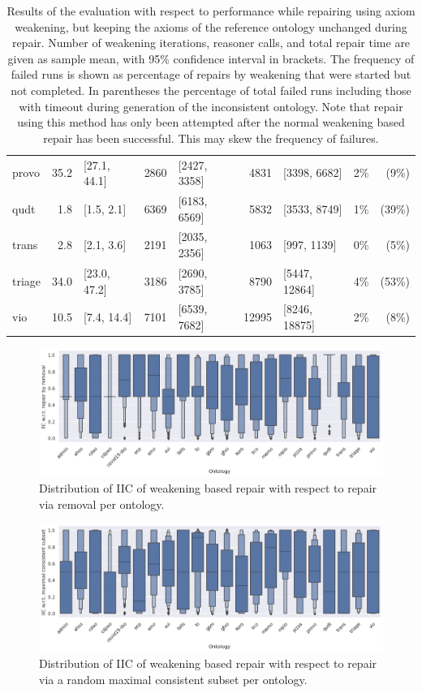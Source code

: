 \begin{table}[htbp]
\begin{tabular}{|l|r@{ }lr@{ }lr@{ }lr@{ }r|}
    provo & 35.2 & [27.1, 44.1] & 2860 & [2427, 3358] & 4831 & [3398, 6682] & 2\% & (9\%) \\
    qudt & 1.8 & [1.5, 2.1] & 6369 & [6183, 6569] & 5832 & [3533, 8749] & 1\% & (39\%) \\
    trans & 2.8 & [2.1, 3.6] & 2191 & [2035, 2356] & 1063 & [997, 1139] & 0\% & (5\%) \\
    triage & 34.0 & [23.0, 47.2] & 3186 & [2690, 3785] & 8790 & [5447, 12864] & 4\% & (53\%) \\
    vio & 10.5 & [7.4, 14.4] & 7101 & [6539, 7682] & 12995 & [8246, 18875] & 2\% & (8\%) \\
    \hline
  \end{tabular}
  \caption{Results of the evaluation with respect to performance while repairing using axiom weakening, but keeping the axioms of the reference ontology unchanged during repair. Number of weakening iterations, reasoner calls, and total repair time are given as sample mean, with 95\% confidence interval in brackets. The frequency of failed runs is shown as percentage of repairs by weakening that were started but not completed. In parentheses the percentage of total failed runs including those with timeout during generation of the inconsistent ontology. Note that repair using this method has only been attempted after the normal weakening based repair has been successful. This may skew the frequency of failures.}
\end{table}

\begin{figure}[htbp]
  \centering
  \includegraphics[width=\textwidth]{resources/iic-remove-ontology-violin.png}
  \caption{Distribution of IIC of weakening based repair with respect to repair via removal per ontology.}
\end{figure}

\begin{figure}[htbp]
  \centering
  \includegraphics[width=\textwidth]{resources/iic-mcs-ontology-violin.png}
  \caption{Distribution of IIC of weakening based repair with respect to repair via a random maximal consistent subset per ontology.}
\end{figure}

